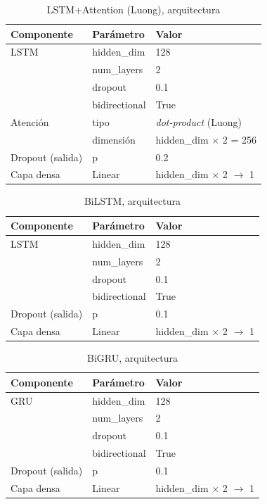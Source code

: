 \begin{table}[H]
\centering
\caption{LSTM+Attention (Luong), arquitectura}
\label{tab:hyper_lstmattn}
\small
\begin{tabular}{@{}llp{7cm}@{}}
\toprule
\textbf{Componente} & \textbf{Par\'ametro} & \textbf{Valor} \\
\midrule
LSTM & hidden\_dim & 128 \\
 & num\_layers & 2 \\
 & dropout & 0.1 \\
 & bidirectional & True \\
\midrule
Atenci\'on & tipo & \textit{dot-product} (Luong) \\
 & dimensi\'on & hidden\_dim $\times$ 2 = 256 \\
\midrule
Dropout (salida) & p & 0.2 \\
Capa densa & Linear & hidden\_dim $\times$ 2 $\to$ 1 \\
\bottomrule
\end{tabular}
\end{table}

\begin{table}[H]
\centering
\caption{BiLSTM, arquitectura}
\label{tab:hyper_bilstm}
\small
\begin{tabular}{@{}llp{7cm}@{}}
\toprule
\textbf{Componente} & \textbf{Par\'ametro} & \textbf{Valor} \\
\midrule
LSTM & hidden\_dim & 128 \\
 & num\_layers & 2 \\
 & dropout & 0.1 \\
 & bidirectional & True \\
\midrule
Dropout (salida) & p & 0.1 \\
Capa densa & Linear & hidden\_dim $\times$ 2 $\to$ 1 \\
\bottomrule
\end{tabular}
\end{table}

\begin{table}[H]
\centering
\caption{BiGRU, arquitectura}
\label{tab:hyper_bigru}
\small
\begin{tabular}{@{}llp{7cm}@{}}
\toprule
\textbf{Componente} & \textbf{Par\'ametro} & \textbf{Valor} \\
\midrule
GRU & hidden\_dim & 128 \\
 & num\_layers & 2 \\
 & dropout & 0.1 \\
 & bidirectional & True \\
\midrule
Dropout (salida) & p & 0.1 \\
Capa densa & Linear & hidden\_dim $\times$ 2 $\to$ 1 \\
\bottomrule
\end{tabular}
\end{table}

